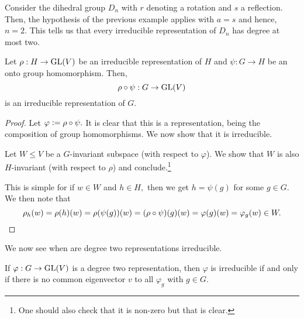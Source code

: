 \begin{ex} \label{ex:irredrepDndegbound}
	Consider the dihedral group $D_n$ with $r$ denoting a rotation and $s$ a reflection. Then, the hypothesis of the previous example applies with $a = s$ and hence, $n = 2.$ This tells us that every irreducible representation of $D_n$ has degree at most two.
\end{ex}

\begin{thm} \label{thm:ontogrouphomogivesirredrep}
	Let $\rho : H \to \operatorname{GL}(V)$ be an irreducible representation of $H$ and $\psi : G \to H$ be an onto group homomorphism. Then,
	\begin{equation*} 
		\rho \circ \psi : G \to \operatorname{GL}(V)
	\end{equation*}
	is an irreducible representation of $G.$
\end{thm}
\begin{proof} 
	Let $\varphi \vcentcolon= \rho \circ \psi.$ It is clear that this is a representation, being the composition of group homomorphisms. We now show that it is irreducible.

	Let $W \le V$ be a $G$-invariant subspace (with respect to $\varphi$). We show that $W$ is also $H$-invariant (with respect to $\rho$) and conclude.\footnote{One should also check that it is non-zero but that is clear.}

	This is simple for if $w \in W$ and $h \in H,$ then we get $h = \psi(g)$ for some $g \in G.$ We then note that
	\begin{equation*} 
		\rho_h(w) = \rho(h)(w) = \rho(\psi(g))(w) = (\rho \circ \psi)(g)(w) = \varphi(g)(w) = \varphi_g(w) \in W. \qedhere
	\end{equation*}
\end{proof}

We now see when are degree two representations irreducible.	

\begin{prop} \label{prop:deg2repirreducible}
	If $\varphi:G\to \operatorname{GL}(V)$ is a degree two representation, then $\varphi$ is irreducible if and only if there is no common eigenvector $v$ to all $\varphi_g$ with $g \in G.$
\end{prop}


